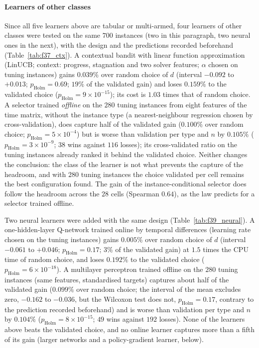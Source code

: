 \paragraph{Learners of other classes}
Since all five learners above are tabular or multi-armed, four learners of other classes were tested on the same $700$ instances (two in this paragraph, two neural ones in the next), with the design and the predictions recorded beforehand (Table~\ref{tab:f37_ctx}). A contextual bandit with linear function approximation (LinUCB; context: progress, stagnation and two solver features;
$\alpha$ chosen on tuning instances) gains $0.039\%$ over random choice of $d$ (interval $-0.092$ to $+0.013$; $p_{\mathrm{Holm}}=0.69$; $19\%$ of the validated gain) and loses $0.159\%$ to the validated choice ($p_{\mathrm{Holm}}=9\times10^{-15}$); its cost is $1.03$ times that of random choice. A selector trained \emph{offline} on the $280$ tuning instances from eight features of the time matrix, without the instance type
(a nearest-neighbour regression chosen by cross-validation), does capture half of the validated gain ($0.100\%$ over random choice; $p_{\mathrm{Holm}}=5\times10^{-4}$) but is worse than validation per type and $n$ by $0.105\%$ ($p_{\mathrm{Holm}}=3\times10^{-9}$; $38$ wins against $116$ losses); its cross-validated ratio on the tuning instances already ranked it behind the validated choice. Neither changes the conclusion: the class of the learner is not what prevents the capture of the headroom,
and with $280$ tuning instances the choice validated per cell remains the best configuration found. The gain of the instance-conditional selector does follow the headroom across the $28$ cells (Spearman $0.64$), as the law predicts for a selector trained offline.



Two neural learners were added with the same design (Table~\ref{tab:f39_neural}). A one-hidden-layer Q-network trained online by temporal differences (learning rate chosen on the tuning instances) gains $0.005\%$ over random choice of $d$ (interval $-0.061$ to $+0.046$;
$p_{\mathrm{Holm}}=0.17$; $3\%$ of the validated gain) at $1.5$ times the CPU time of random choice, and loses $0.192\%$ to the validated choice ($p_{\mathrm{Holm}}=6\times10^{-18}$). A multilayer perceptron trained offline on the $280$ tuning instances (same features, standardised targets) captures about half of the validated
gain ($0.099\%$ over random choice; the interval of the mean excludes zero, $-0.162$ to $-0.036$, but the Wilcoxon test does not, $p_{\mathrm{Holm}}=0.17$, contrary to the prediction recorded beforehand) and is worse than validation per type and $n$ by $0.104\%$ ($p_{\mathrm{Holm}}=8\times10^{-15}$; $49$ wins against $192$ losses).
None of the learners above beats the validated choice, and no online learner captures more than a fifth of its gain (larger networks and a policy-gradient learner, below).

